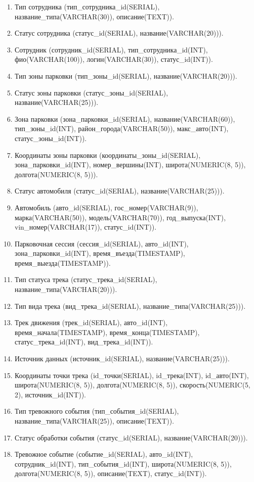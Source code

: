 \begin{enumerate}
    \item Тип сотрудника (тип\_сотрудника\_id(SERIAL), название\_типа(VARCHAR(30)), описание(TEXT)).
    \item Статус сотрудника (статус\_id(SERIAL), название(VARCHAR(20))).
    \item Сотрудник (сотрудник\_id(SERIAL), тип\_сотрудника\_id(INT), фио(VARCHAR(100)), логин(VARCHAR(30)), статус\_id(INT)).

    \item Тип зоны парковки (тип\_зоны\_id(SERIAL), название(VARCHAR(20))).
    \item Статус зоны парковки (статус\_зоны\_id(SERIAL), название(VARCHAR(25))).
    \item Зона парковки (зона\_парковки\_id(SERIAL), название(VARCHAR(60)), тип\_зоны\_id(INT), район\_города(VARCHAR(50)), макс\_авто(INT), статус\_зоны\_id(INT)).
    \item Координаты зоны парковки (координаты\_зоны\_id(SERIAL), зона\_парковки\_id(INT), номер\_вершины(INT), широта(NUMERIC(8, 5)), долгота(NUMERIC(8, 5))).

    \item Статус автомобиля (статус\_id(SERIAL), название(VARCHAR(25))).
    \item Автомобиль (авто\_id(SERIAL), гос\_номер(VARCHAR(9)), марка(VARCHAR(50)), модель(VARCHAR(70)), год\_выпуска(INT), vin\_номер(VARCHAR(17)), статус\_id(INT)).
    \item Парковочная сессия (сессия\_id(SERIAL), авто\_id(INT), зона\_парковки\_id(INT), время\_въезда(TIMESTAMP), время\_выезда(TIMESTAMP)).

    \item Тип статуса трека (статус\_трека\_id(SERIAL), название\_типа(VARCHAR(20))).
    \item Тип вида трека (вид\_трека\_id(SERIAL), название\_типа(VARCHAR(25))).
    \item Трек движения (трек\_id(SERIAL), авто\_id(INT), время\_начала(TIMESTAMP), время\_конца(TIMESTAMP), статус\_трека\_id(INT), вид\_трека\_id(INT)).
    \item Источник данных (источник\_id(SERIAL), название(VARCHAR(25))).
    \item Координаты точки трека (id\_точки(SERIAL), id\_трека(INT), id\_авто(INT), широта(NUMERIC(8, 5)), долгота(NUMERIC(8, 5)), скорость(NUMERIC(5, 2), источник\_id(INT)).

    \item Тип тревожного события (тип\_события\_id(SERIAL), название\_типа(VARCHAR(25)), описание(TEXT)).
    \item Статус обработки события (статус\_id(SERIAL), название(VARCHAR(20))).
    \item Тревожное событие (событие\_id(SERIAL), авто\_id(INT), сотрудник\_id(INT), тип\_события\_id(INT), широта(NUMERIC(8, 5)), долгота(NUMERIC(8, 5)), описание(TEXT), статус\_id(INT)).


\end{enumerate}
